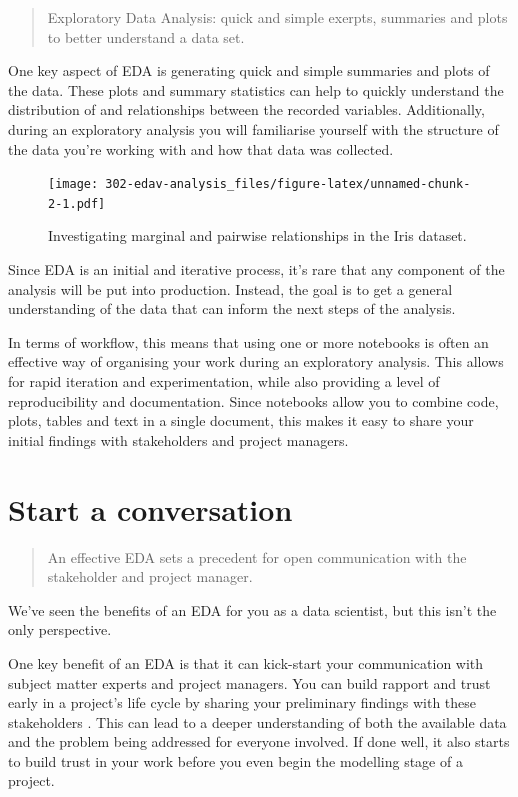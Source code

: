 \documentclass[
  12pt,
]{book}
\begin{document}
\begin{quote}
Exploratory Data Analysis: quick and simple exerpts, summaries and plots to better understand a data set.
\end{quote}

One key aspect of EDA is generating quick and simple summaries and plots of the data. These plots and summary statistics can help to quickly understand the distribution of and relationships between the recorded variables. Additionally, during an exploratory analysis you will familiarise yourself with the structure of the data you're working with and how that data was collected.

\begin{figure}
\centering
\texttt{[image: 302-edav-analysis\_files/figure-latex/unnamed-chunk-2-1.pdf]}
\caption{\label{fig:unnamed-chunk-2}Investigating marginal and pairwise relationships in the Iris dataset.}
\end{figure}

Since EDA is an initial and iterative process, it's rare that any component of the analysis will be put into production. Instead, the goal is to get a general understanding of the data that can inform the next steps of the analysis.

In terms of workflow, this means that using one or more notebooks is often an effective way of organising your work during an exploratory analysis. This allows for rapid iteration and experimentation, while also providing a level of reproducibility and documentation. Since notebooks allow you to combine code, plots, tables and text in a single document, this makes it easy to share your initial findings with stakeholders and project managers.

\hypertarget{start-a-conversation}{%
\section{Start a conversation}\label{start-a-conversation}}

\begin{quote}
An effective EDA sets a precedent for open communication with the stakeholder and project manager.
\end{quote}

We've seen the benefits of an EDA for you as a data scientist, but this isn't the only perspective.

One key benefit of an EDA is that it can kick-start your communication with subject matter experts and project managers. You can build rapport and trust early in a project's life cycle by sharing your preliminary findings with these stakeholders . This can lead to a deeper understanding of both the available data and the problem being addressed for everyone involved. If done well, it also starts to build trust in your work before you even begin the modelling stage of a project.
\end{document}
